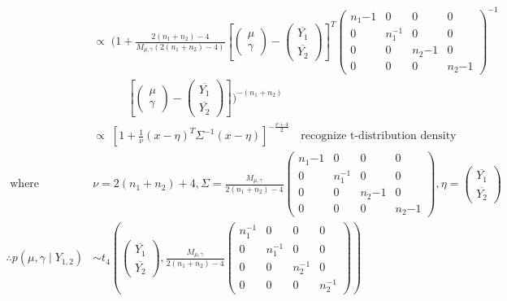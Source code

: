 \documentclass[12pt,letterpaper,twoside]{article}
\begin{document}
\begin{enumerate}[label=(\alph*)]
\begin{align*}
            & \propto \; \biggl(1 + \frac{2(n_1 + n_2) - 4}{M_{\mu, \gamma}(2(n_1 + n_2) - 4)}\left[\left(\begin{matrix}\mu\\ \gamma\end{matrix}\right) - \left(\begin{matrix*}\overline{Y_1}\\ \overline{Y_2}\end{matrix*}\right)\right]^T \left(\begin{matrix*} n_1{-1} & 0 & 0 & 0 \\ 0 & n_1^{-1} & 0 & 0 \\ 0 & 0 & n_2{-1} & 0 \\ 0 & 0 & 0 & n_2{-1} \end{matrix*}\right)^{-1} \\
            & \quad \quad \quad \left[\left(\begin{matrix}\mu\\ \gamma\end{matrix}\right) - \left(\begin{matrix*}\overline{Y_1}\\ \overline{Y_2}\end{matrix*}\right)\right]\biggr)^{-(n_1 + n_2)}\\
            & \propto \; \left[1 + \frac{1}{\nu}(x - \eta)^T\Sigma^{-1}(x - \eta)\right]^{-\frac{\nu + 4}{2}} \quad \text{recognize t-distribution density}\\
        \text{ where }& \nu=2(n_1 + n_2) + 4, \Sigma=\frac{M_{\mu, \gamma}}{2(n_1 + n_2) - 4}\left(\begin{matrix*} n_1{-1} & 0 & 0 & 0 \\ 0 & n_1^{-1} & 0 & 0 \\ 0 & 0 & n_2{-1} & 0 \\ 0 & 0 & 0 & n_2{-1} \end{matrix*}\right), \eta=\left(\begin{matrix*}\overline{Y_1}\\ \overline{Y_2}\end{matrix*}\right)\\
        \therefore p(\mu, \gamma \mid Y_{1,2}) &\sim t_4\left(\left(\begin{matrix*}
            \overline{Y_1}\\ \overline{Y_2} \end{matrix*}\right), \frac{M_{\mu, \gamma}}{2(n_1 + n_2) - 4}\left(\begin{matrix*}
            n_1^{-1} & 0 & 0 & 0 \\ 0 & n_1^{-1} & 0 & 0 \\ 0 & 0 & n_2^{-1} & 0 \\ 0 & 0 & 0 & n_2^{-1}
            \end{matrix*}\right)\right)
    \end{align*}


\end{enumerate}
\end{document}
